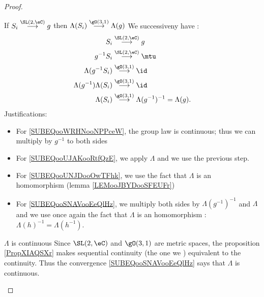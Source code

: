 \begin{proof}
\begin{subproof}
        \item[If $ S_i\stackrel{\SL(2,\eC)}{\longrightarrow}g  $ then $ \Lambda(S_i)\stackrel{\gO(3,1)}{\longrightarrow}\Lambda(g)  $  ]
            We successiveny have :
            \begin{subequations}
                \begin{align}
                    S_i&\stackrel{\SL(2,\eC)}{\longrightarrow}g     \label{SUBEQooPXXZooYJrxqk}\\
                    g^{-1}S_i&\stackrel{\SL(2,\eC)}{\longrightarrow}\mtu        \label{SUBEQooWRHNooNPPceW}\\
                    \Lambda(g^{-1} S_i)&\stackrel{\gO(3,1)}{\longrightarrow}\id \label{SUBEQooUJAKooRtfQzE}\\
                    \Lambda(g^{-1})\Lambda(S_i)&\stackrel{\gO(3,1)}{\longrightarrow}\id \label{SUBEQooUNJDooOwTFhk}\\
                    \Lambda(S_i)&\stackrel{\gO(3,1)}{\longrightarrow}\Lambda(g^{-1})^{-1}=\Lambda(g).   \label{SUBEQooSNAVooEeQlHz}
                \end{align}
            \end{subequations}
            Justifications:
            \begin{itemize}
                \item For \eqref{SUBEQooWRHNooNPPceW}, the group law is continuous; thus we can multiply by \( g^{-1}\) to both sides
                \item For \eqref{SUBEQooUJAKooRtfQzE}, we apply \( \Lambda\) and we use the previous step.
                \item For \eqref{SUBEQooUNJDooOwTFhk}, we use the fact that \( \Lambda\) is an homomorphism (lemma \ref{LEMooJBYDooSFEUFr})
                \item For \eqref{SUBEQooSNAVooEeQlHz}, we multiply both sides by \( \Lambda(g^{-1})^{-1}\) and \( \Lambda\) and we use once again the fact that \( \Lambda\) is an homomorphism : \( \Lambda(h)^{-1}=\Lambda(h^{-1})\).
            \end{itemize}
        \item[$ \Lambda$ is continuous  ]
            Since \( \SL(2,\eC)\) and \( \gO(3,1)\) are metric spaces, the proposition \ref{PropXIAQSXr} makes sequential continuity (the one we ) equivalent to the continuity. Thus the convergence \eqref{SUBEQooSNAVooEeQlHz} says that \( \Lambda\) is continuous.
    \end{subproof}
\end{proof}


